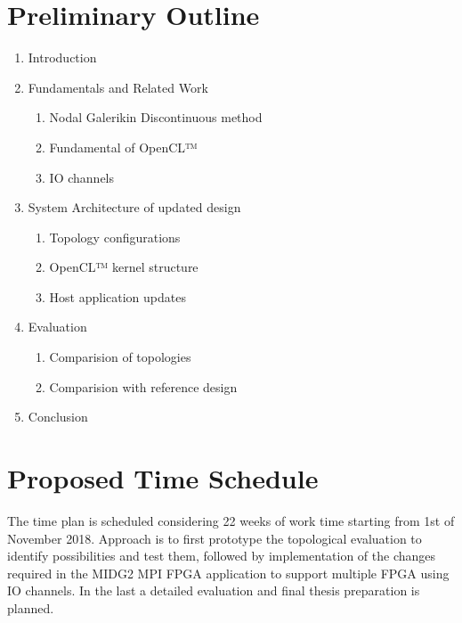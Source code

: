 \documentclass[english,notitlepage]{hgbreport}
\begin{document}
\section{Preliminary Outline}
\begin{enumerate}
	\item Introduction
	\item Fundamentals and Related Work
	\begin{enumerate}
		\item Nodal Galerikin Discontinuous method
		\item Fundamental of OpenCL™
		\item IO channels
	\end{enumerate}
	\item System Architecture of updated design
	\begin{enumerate}
		\item Topology configurations
		\item OpenCL™ kernel structure
		\item Host application updates
	\end{enumerate}
	\item Evaluation
	\begin{enumerate}
		\item Comparision of topologies
		\item Comparision with reference design
	\end{enumerate}
	\item Conclusion

\end{enumerate}

\section{Proposed Time Schedule}

The time plan is scheduled considering 22 weeks of work time starting from 1st of November 2018.
Approach is to first prototype the topological evaluation to identify possibilities and test them,
followed by implementation of the changes required in the MIDG2 MPI FPGA application to support
multiple FPGA using IO channels. In the last a detailed evaluation and final thesis preparation is
planned.
\end{document}

